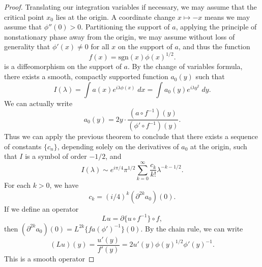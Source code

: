 \begin{proof}
    Translating our integration variables if necessary, we may assume that the critical point $x_0$ lies at the origin. A coordinate change $x \mapsto -x$ means we may assume that $\phi''(0) > 0$. Partitioning the support of $a$, applying the principle of nonstationary phase away from the origin, we may assume without loss of generality that $\phi'(x) \neq 0$ for all $x$ on the support of $a$, and thus the function
    \[ f(x) = \text{sgn}(x) \phi(x)^{1/2}. \]
    is a diffeomorphism on the support of $a$. By the change of variables formula, there exists a smooth, compactly supported function $a_0(y)$ such that
    \[ I(\lambda) = \int a(x) e^{i \lambda \phi(x)}\; dx = \int a_0(y) e^{i \lambda y^2}\; dy. \]
    We can actually write
    \[ a_0(y) = 2 y \cdot \frac{(a \circ f^{-1})(y)}{(\phi' \circ f^{-1})(y)}. \]
    Thus we can apply the previous theorem to conclude that there exists a sequence of constants $\{ c_n \}$, depending solely on the derivatives of $a_0$ at the origin, such that $I$ is a symbol of order $-1/2$, and
    \[ I(\lambda) \sim e^{i \pi / 4} \pi^{1/2} \sum_{k = 0}^\infty \frac{c_k}{k!} \lambda^{-k-1/2}. \]
    For each $k > 0$, we have
    \[ c_k = (i/4)^k (\partial^{2k} a_0)(0). \]
    If we define an operator
    \[ Lu = \partial \{ u \circ f^{-1} \} \circ f, \]
    then $(\partial^{2k} a_0)(0) = L^{2k} \{ f a (\phi')^{-1} \}(0)$. By the chain rule, we can write
    \[ (Lu)(y) = \frac{u'(y)}{f'(y)} = 2 u'(y) \phi(y)^{1/2} \phi'(y)^{-1}. \]
    This is a smooth operator 




\end{proof}
